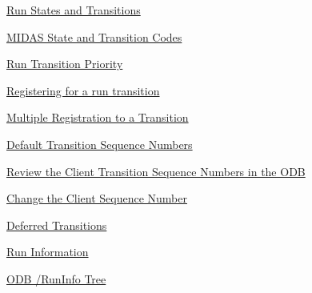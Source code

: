 \begin{TabularC}{2}
\begin{TabularC}{2}
\begin{DoxyItemize}
\item \hyperlink{RC_Run_States_and_Transitions}{Run States and Transitions} 
\begin{DoxyItemize}
\item \hyperlink{RC_Run_States_and_Transitions_RC_state_transition}{MIDAS State and Transition Codes} 
\item \hyperlink{RC_Run_States_and_Transitions_RC_Transition_priority}{Run Transition Priority} 
\begin{DoxyItemize}
\item \hyperlink{RC_Run_States_and_Transitions_RC_Register_for_run_transition}{Registering for a run transition} 
\begin{DoxyItemize}
\item \hyperlink{RC_Run_States_and_Transitions_RC_Multiple_Registration}{Multiple Registration to a Transition} 
\end{DoxyItemize}
\item \hyperlink{RC_Run_States_and_Transitions_RC_Default_Seq_Numbers}{Default Transition Sequence Numbers} 
\item \hyperlink{RC_Run_States_and_Transitions_RC_Review_Seq_Num}{Review the Client Transition Sequence Numbers in the ODB} 
\item \hyperlink{RC_Run_States_and_Transitions_RC_Change_Seq_Num}{Change the Client Sequence Number} 
\end{DoxyItemize}
\item \hyperlink{RC_Run_States_and_Transitions_RC_Deferred_Transition}{Deferred Transitions} 
\item \hyperlink{RC_Run_States_and_Transitions_RC_ODB_RunInfo}{Run Information} 
\begin{DoxyItemize}
\item \hyperlink{RC_Run_States_and_Transitions_RC_ODB_RunInfo_Tree}{ODB /RunInfo Tree} 
\end{DoxyItemize}
\end{DoxyItemize}\par
 

\end{DoxyItemize}
\end{TabularC}
\end{TabularC}
